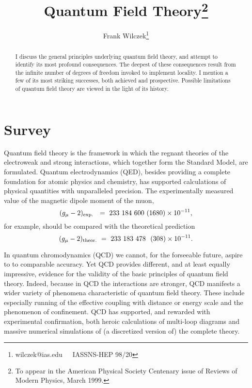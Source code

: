 \documentclass[aps,epsf]{revtex4}
\begin{document}
\title{Quantum Field Theory\thanks{To appear in the American Physical
Society Centenary issue of Reviews of Modern Physics, March 1999.}}

\author{Frank Wilczek\thanks{wilczek@ias.edu~~~IASSNS-HEP 98/20}}
\address{Institute for Advanced Study, School of Natural Science, Olden Lane, 
Princeton, NJ 08540}
\maketitle

\begin{abstract}

I discuss the general principles underlying quantum field theory, and
attempt to identify its most profound consequences.  The deepest of
these consequences result from the infinite number of degrees of
freedom invoked to implement locality.  I mention a few of its most
striking successes, both achieved and prospective.  Possible
limitations of quantum field theory are viewed in the light of its history.
\end{abstract}


\section{Survey}

Quantum field theory is the framework in which the regnant theories of
the electroweak and strong interactions, which together form the
Standard Model, are formulated.  Quantum electrodynamics (QED),
besides providing a complete foundation for atomic physics and
chemistry, has supported calculations of physical quantities with
unparalleled precision.  The experimentally measured value of the magnetic
dipole moment of the muon, 
\begin{equation}
(g_\mu -2)_{\rm exp.~} ~=~
233 ~184 ~600~ (1680) \times 10^{-11},
\end{equation}
for example,
should be compared with the theoretical prediction
\begin{equation}
(g_\mu-2)_{\rm theor.} ~=~ 233~ 183~ 478 ~~(308)
\times 10^{-11}.
\end{equation}

In quantum chromodynamics (QCD) we
cannot, for the forseeable future, aspire to to comparable accuracy.
Yet QCD provides different, and at least equally impressive, evidence
for the validity of the basic principles of quantum field theory.
Indeed, because in QCD the interactions are stronger, QCD
manifests a wider variety of phenomena characteristic of quantum field
theory.  These include especially running of the effective coupling
with distance or energy scale and the phenomenon of confinement.  QCD
has supported, and rewarded with experimental confirmation, both
heroic calculations of multi-loop diagrams and massive numerical
simulations of (a discretized version of) the complete theory.
\end{document}
